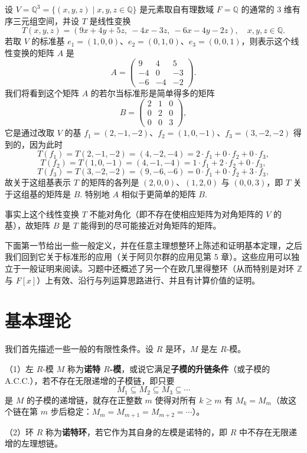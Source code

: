 \begin{example}
设 \(V = \mathbb{Q}^3 = \{(x, y, z) \mid x, y, z \in \mathbb{Q}\}\) 是元素取自有理数域 \(F = \mathbb{Q}\) 的通常的 3 维有序三元组空间，并设 \(T\) 是线性变换
\[
T(x, y, z) = (9x+4y+5z,\ -4x-3z,\ -6x-4y-2z), \quad x, y, z \in \mathbb{Q}.
\]
若取 \(V\) 的标准基 \(e_1 = (1, 0, 0)\)、\(e_2 = (0, 1, 0)\)、\(e_3 = (0, 0, 1)\)，则表示这个线性变换的矩阵 \(A\) 是
\[
A = \begin{pmatrix} 9 & 4 & 5 \\ -4 & 0 & -3 \\ -6 & -4 & -2 \end{pmatrix}.
\]
我们将看到这个矩阵 \(A\) 的若尔当标准形是简单得多的矩阵
\[
B = \begin{pmatrix} 2 & 1 & 0 \\ 0 & 2 & 0 \\ 0 & 0 & 3 \end{pmatrix},
\]
它是通过改取 \(V\) 的基 \(f_1 = (2, -1, -2)\)、\(f_2 = (1, 0, -1)\)、\(f_3 = (3, -2, -2)\) 得到的，因为此时
\[
T(f_1) = T(2, -1, -2) = (4, -2, -4) = 2 \cdot f_1+0 \cdot f_2+0 \cdot f_3,
\]
\[
T(f_2) = T(1, 0, -1) = (4, -1, -4) = 1 \cdot f_1+2 \cdot f_2+0 \cdot f_3,
\]
\[
T(f_3) = T(3, -2, -2) = (9, -6, -6) = 0 \cdot f_1+0 \cdot f_2+3 \cdot f_3,
\]
故关于这组基表示 \(T\) 的矩阵的各列是 \((2, 0, 0)\)、\((1, 2, 0)\) 与 \((0, 0, 3)\)，即 \(T\) 关于这组基的矩阵是 \(B\). 特别地 \(A\) 相似于更简单的矩阵 \(B\).

事实上这个线性变换 \(T\) 不能对角化（即不存在使相应矩阵为对角矩阵的 \(V\) 的基），故矩阵 \(B\) 是 \(T\) 能得到的尽可能接近对角矩阵的矩阵。
\end{example}

下面第一节给出一些一般定义，并在任意主理想整环上陈述和证明基本定理，之后我们回到它关于标准形的应用（关于阿贝尔群的应用见第 5 章）。这些应用可以独立于一般证明来阅读。习题中还概述了另一个在欧几里得整环（从而特别是对环 \(\mathbb{Z}\) 与 \(F[x]\)）上有效、沿行与列运算思路进行、并且有计算价值的证明。

\section{基本理论}

我们首先描述一些一般的有限性条件。设 \(R\) 是环，\(M\) 是左 \(R\)-模。

\begin{definition}
（1）左 \(R\)-模 \(M\) 称为\textbf{诺特 \(R\)-模}，或说它满足\textbf{子模的升链条件}（或子模的 A.C.C.），若不存在无限递增的子模链，即只要
\[
M_1 \subseteq M_2 \subseteq M_3 \subseteq \cdots
\]
是 \(M\) 的子模的递增链，就存在正整数 \(m\) 使得对所有 \(k \geq m\) 有 \(M_k = M_m\)（故这个链在第 \(m\) 步后稳定：\(M_m = M_{m+1} = M_{m+2} = \cdots\)）。

（2）环 \(R\) 称为\textbf{诺特环}，若它作为其自身的左模是诺特的，即 \(R\) 中不存在无限递增的左理想链。
\end{definition}

